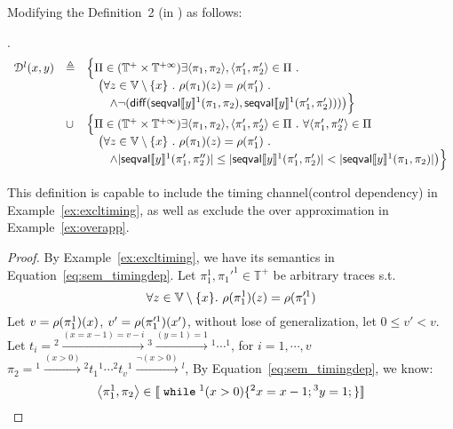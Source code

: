  \begin{example}
 Modifying the Definition~2 (in \cite{cousot2019abstract}) as follows:
 \begin{defn}.
 \label{defn:mdfy_dep}
 \[
 	\begin{array}{lll}
 	\mathcal{D}^l(x, y) & \triangleq &
 	\Big\{ 
 	\Pi \in (\mathbb{T}^{+} \times \mathbb{T}^{+\infty})
 	\exists \langle \pi_1, \pi_2 \rangle, \langle \pi_1', \pi_2' \rangle \in \Pi ~.~ \\
 	&& \quad \big(
 	\forall z \in \mathbb{V}\setminus \{x\} ~.~ \rho(\pi_1)(z) = \rho(\pi_1') ~.~ \\
 	&& \quad  \quad \land \neg(\mathsf{diff}(\mathsf{seqval}\llbracket y \rrbracket{}^1(\pi_1, \pi_2 ), \mathsf{seqval}\llbracket y \rrbracket{}^1(\pi'_1, \pi_2')))
 	\big) \Big\} \\
 	& \cup & \Big\{ \Pi \in (\mathbb{T}^{+} \times \mathbb{T}^{+\infty})
 	\exists \langle \pi_1, \pi_2 \rangle, \langle \pi_1', \pi_2' \rangle \in \Pi ~.~ \forall \langle \pi_1', \pi_2'' \rangle \in \Pi\\
 	&& \quad \big(
 	\forall z \in \mathbb{V}\setminus \{x\} ~.~ \rho(\pi_1)(z) = \rho(\pi_1') ~.~ \\
 	&& \quad  \quad  \land |\mathsf{seqval}\llbracket y \rrbracket{}^1(\pi_1', \pi_2'')| \leq |\mathsf{seqval}\llbracket y \rrbracket{}^1(\pi_1', \pi_2')| <  
 	|\mathsf{seqval}\llbracket y \rrbracket{}^1(\pi_1, \pi_2)|\big) \Big\}
 	\end{array}
 \]
 \end{defn}
 This definition is capable to include the timing channel(control dependency) in Example~\ref{ex:excltiming},
 as well as exclude the over approximation in Example~\ref{ex:overapp}.
 \begin{proof}
 By Example~\ref{ex:excltiming}, we have its semantics in Equation~\ref{eq:sem_timingdep}.
 Let $\pi_1^1, \pi_1'^1 \in \mathbb{T^{+}}$ be arbitrary traces s.t. 
 $$\forall z \in \mathbb{V}\setminus \{x\}. ~ \rho(\pi_1^1)(z) = \rho(\pi_1'^1) $$ 
 Let $v = \rho(\pi_1^1)(x) $, $v' = \rho(\pi_1'^1)(x')$, without lose of generalization, let $0 \leq v' < v$.
 \\
 Let 
 $t_i = {}^2 \xrightarrow{(x = x - 1) = v - i } {}^3 \xrightarrow{(y = 1) = 1} {}^1 \cdots  {}^1$, for $i = 1, \cdots, v$
 $\pi_2 = {}^1 \xrightarrow{(x > 0)} {}^2 t_1 {}^1 \cdots   {}^2 t_v {}^1 \xrightarrow{\neg(x > 0)} {}^l $,
  By Equation~\ref{eq:sem_timingdep}, we know:
 \[
 	\left< \pi_1^1, \pi_2 \right> \in \sem{\ewhile {}^1 (x > 0) \{{}^2 x = x - 1; {}^3 y = 1;\} }
\]
\end{proof}
\end{example}
